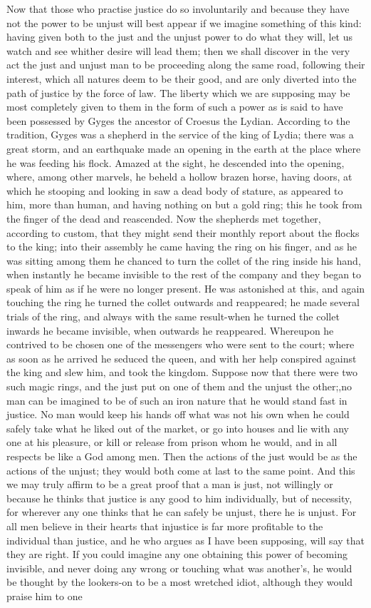 Now that those who practise justice do so involuntarily and because they have not the power to be unjust will best appear if we imagine something of this kind: having given both to the just and the unjust power to do what they will, let us watch and see whither desire will lead them; then we shall discover in the very act the just and unjust man to be proceeding along the same road, following their interest, which all natures deem to be their good, and are only diverted into the path of justice by the force of law. The liberty which we are supposing may be most completely given to them in the form of such a power as is said to have been possessed by Gyges the ancestor of Croesus the Lydian. According to the tradition, Gyges was a shepherd in the service of the king of Lydia; there was a great storm, and an earthquake made an opening in the earth at the place where he was feeding his flock. Amazed at the sight, he descended into the opening, where, among other marvels, he beheld a hollow brazen horse, having doors, at which he stooping and looking in saw a dead body of stature, as appeared to him, more than human, and having nothing on but a gold ring; this he took from the finger of the dead and reascended. Now the shepherds met together, according to custom, that they might send their monthly report about the flocks to the king; into their assembly he came having the ring on his finger, and as he was sitting among them he chanced to turn the collet of the ring inside his hand, when instantly he became invisible to the rest of the company and they began to speak of him as if he were no longer present. He was astonished at this, and again touching the ring he turned the collet outwards and reappeared; he made several trials of the ring, and always with the same result-when he turned the collet inwards he became invisible, when outwards he reappeared. Whereupon he contrived to be chosen one of the messengers who were sent to the court; where as soon as he arrived he seduced the queen, and with her help conspired against the king and slew him, and took the kingdom. Suppose now that there were two such magic rings, and the just put on one of them and the unjust the other;,no man can be imagined to be of such an iron nature that he would stand fast in justice. No man would keep his hands off what was not his own when he could safely take what he liked out of the market, or go into houses and lie with any one at his pleasure, or kill or release from prison whom he would, and in all respects be like a God among men. Then the actions of the just would be as the actions of the unjust; they would both come at last to the same point. And this we may truly affirm to be a great proof that a man is just, not willingly or because he thinks that justice is any good to him individually, but of necessity, for wherever any one thinks that he can safely be unjust, there he is unjust. For all men believe in their hearts that injustice is far more profitable to the individual than justice, and he who argues as I have been supposing, will say that they are right. If you could imagine any one obtaining this power of becoming invisible, and never doing any wrong or touching what was another's, he would be thought by the lookers-on to be a most wretched idiot, although they would praise him to one 